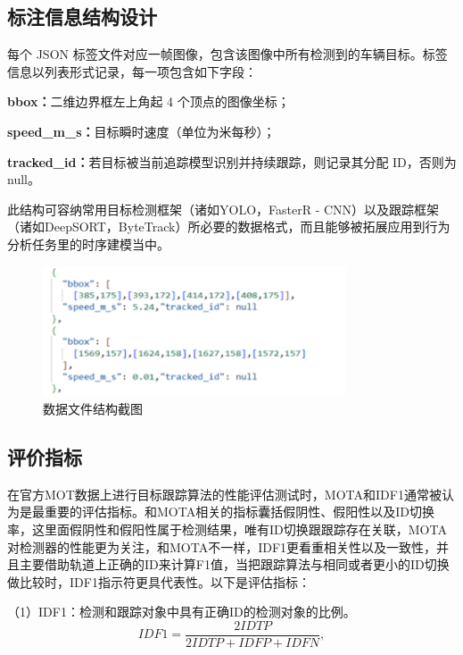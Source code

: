 \subsection{标注信息结构设计}

每个 JSON 标签文件对应一帧图像，包含该图像中所有检测到的车辆目标。标签信息以列表形式记录，每一项包含如下字段：

\textbf{bbox：}二维边界框左上角起 4 个顶点的图像坐标；

\textbf{speed\_m\_s：}目标瞬时速度（单位为米每秒）；

\textbf{tracked\_id：}若目标被当前追踪模型识别并持续跟踪，则记录其分配 ID，否则为 null。

此结构可容纳常用目标检测框架（诸如YOLO，FasterR - CNN）以及跟踪框架（诸如DeepSORT，ByteTrack）所必要的数据格式，而且能够被拓展应用到行为分析任务里的时序建模当中。

\begin{figure}[H]
	\centering
	\includegraphics[width=0.8\textwidth]{images/图8 数据文件结构截图.pdf}  %
	\caption{数据文件结构截图}
	\label{fig:example_image}  %
\end{figure}

\subsection{评价指标}

在官方MOT数据上进行目标跟踪算法的性能评估测试时，MOTA\cite{bernardin2008evaluating}和IDF1\cite{ristani2016performance}通常被认为是最重要的评估指标。和MOTA相关的指标囊括假阴性、假阳性以及ID切换率，这里面假阴性和假阳性属于检测结果，唯有ID切换跟跟踪存在关联，MOTA对检测器的性能更为关注，和MOTA不一样，IDF1更看重相关性以及一致性，并且主要借助轨道上正确的ID来计算F1值，当把跟踪算法与相同或者更小的ID切换做比较时，IDF1指示符更具代表性。以下是评估指标：

（1）IDF1：检测和跟踪对象中具有正确ID的检测对象的比例。
\begin{equation}
	IDF1 = \frac{2IDTP}{2IDTP + IDFP + IDFN},
\end{equation}

